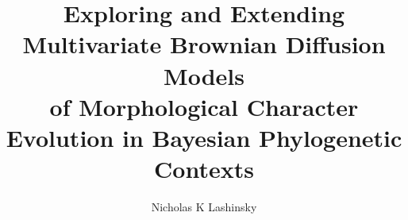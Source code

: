 \documentclass[12pt,draftcls]{ucdavisthesis}
\title          {Exploring and Extending Multivariate Brownian Diffusion Models \\of Morphological Character Evolution in Bayesian Phylogenetic Contexts}
\author         {Nicholas K Lashinsky}
\begin{document}
\newcommand{\bibfont}{\singlespacing}



\makeintropages %







\end{document}
